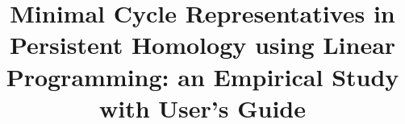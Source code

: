 \def\corrEmail{lziegel1@macalester.edu}
 



 \onecolumn
{}
\title[Running Title]{Minimal Cycle Representatives in Persistent Homology using Linear Programming: an Empirical Study with User's Guide} 
\author[\firstAuthorLast ]{\Authors} %
\address{} %
\correspondance{} %
\extraAuth{}%
 

\maketitle

